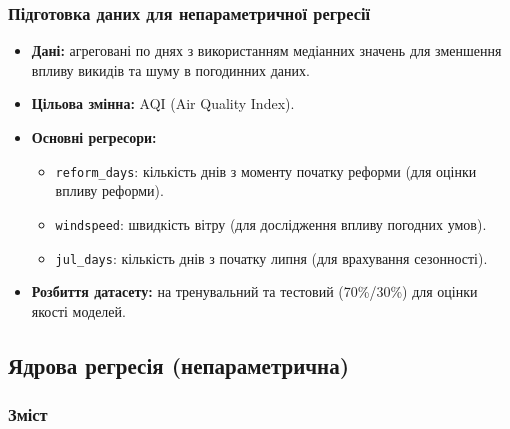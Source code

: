 ﻿\documentclass{beamer}
\begin{document}
\begin{frame}
  \frametitle{Підготовка даних для непараметричної регресії}
  \begin{itemize}
    \item \textbf{Дані:} агреговані по днях з використанням медіанних значень для зменшення впливу викидів та шуму в погодинних даних.
    \item \textbf{Цільова змінна:} AQI (Air Quality Index).
    \item \textbf{Основні регресори:}
        \begin{itemize}
            \item \texttt{reform\_days}: кількість днів з моменту початку реформи (для оцінки впливу реформи).
            \item \texttt{windspeed}: швидкість вітру (для дослідження впливу погодних умов).
            \item \texttt{jul\_days}: кількість днів з початку липня (для врахування сезонності).
        \end{itemize}
    \item \textbf{Розбиття датасету:} на тренувальний та тестовий (70\%/30\%) для оцінки якості моделей.
  \end{itemize}
\end{frame}

\begin{frame}
  \section{Ядрова регресія (непараметрична)}

  \frametitle{Зміст}
  \tableofcontents[currentsection]
\end{frame}
\end{document}
